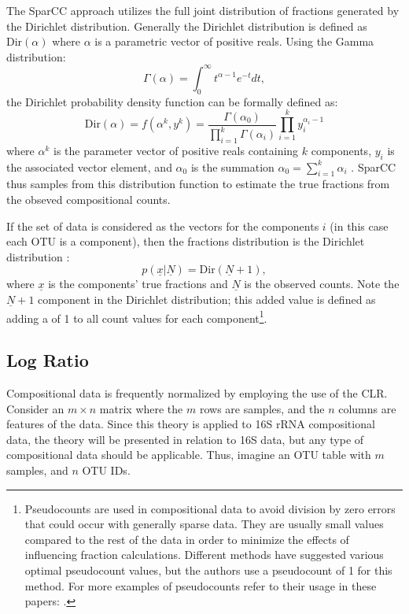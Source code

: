 The \acrshort{SparCC} approach utilizes the full joint distribution of fractions generated by the Dirichlet distribution. Generally the Dirichlet distribution is defined as $\text{Dir}\left(\alpha\right)$ where $\alpha$ is a parametric vector of positive reals. Using the Gamma distribution:
\begin{equation}\label{eq:gamma}
    \Gamma\left(\alpha\right) = \int_0^{\infty} t^{\alpha-1} e^{-t} dt,
\end{equation}
the Dirichlet probability density function can be formally defined as:
\begin{equation}\label{eq:-dirich}
    \text{Dir}\left( \alpha \right) = f\left(\alpha^k, y^k\right) = \frac{\Gamma \left( \alpha_0 \right)}{\prod^k_{i=1}\Gamma \left( \alpha_i \right)} \prod_{i=1}^k y_i^{\alpha_i -1}
\end{equation}
where $\alpha^k$ is the parameter vector of positive reals containing $k$ components, $y_i$ is the associated vector element, and $\alpha_0$ is the summation $\alpha_0 = \sum_{i=1}^k \alpha_i$ \citep{Lin2016}. \acrshort{SparCC} thus samples from this distribution function to estimate the true fractions from the obseved compositional counts. 

If the set of data is considered as the vectors for the components $i$ (in this case each \acrshort{OTU} is a component), then the fractions distribution is the Dirichlet distribution \citep{Gelman2013}:
\begin{equation}\label{eq:dirichlet}
    p\left(\underline{x}|\underline{N}\right)=\text{Dir}\left(\underline{N}+1\right),
\end{equation}
where $\underline{x}$ is the components' true fractions and $\underline{N}$ is the observed counts. Note the $\underline{N}+1$ component in the Dirichlet distribution; this added value is defined as adding a  of 1 to all count values for each component\footnote{Pseudocounts are used in compositional data to avoid division by zero errors that could occur with generally sparse data. They are usually small values compared to the rest of the data in order to minimize the effects of influencing fraction calculations. Different methods have suggested various optimal pseudocount values, but the authors use a pseudocount of 1 for this method. For more examples of pseudocounts refer to their usage in these papers: \citet{Weiss2017, Mandal2015, Wang2017}.}.


\subsection{Log Ratio}\label{theory-log}
Compositional data is frequently normalized by employing the use of the \acrlong{CLR}. Consider an $m \times n$ matrix where the $m$ rows are samples, and the $n$ columns are features of the data. Since this theory is applied to 16S \acrshort{rRNA} compositional data, the theory will be presented in relation to 16S data, but any type of compositional data should be applicable. Thus, imagine an \acrshort{OTU} table with $m$ samples, and $n$ \acrshort{OTU} IDs.

